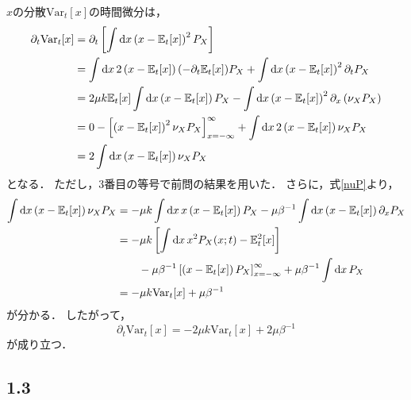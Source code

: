 \documentclass[a4paper,11pt]{jsarticle}
\begin{document}
$x$の分散$\mathrm{Var}_t[x]$の時間微分は，
\begin{align}
  \partial_t \mathrm{Var}_t[x] 
  &= \partial_t \left[ \int \dd{x} \left(x-\mathbb{E}_t[x]\right)^2 P_X \right] \notag\\
  &= \int \dd{x} 2\left(x-\mathbb{E}_t[x]\right)(-\partial_t \mathbb{E}_t[x]) P_X + \int \dd{x} \left(x-\mathbb{E}_t[x]\right)^2 \partial_t P_X \notag\\
  &= 2\mu k \mathbb{E}_t[x] \int \dd{x} \left(x-\mathbb{E}_t[x]\right) P_X - \int \dd{x} \left(x-\mathbb{E}_t[x]\right)^2 \partial_x \left(\nu_X P_X\right) \notag \\
  &= 0 - \left[\left(x-\mathbb{E}_t[x]\right)^2\nu_X P_X\right]_{x=-\infty}^{\infty} + \int \dd{x} 2\left(x-\mathbb{E}_t[x]\right) \nu_X P_X \notag\\
  &= 2\int \dd{x} \left(x-\mathbb{E}_t[x]\right) \nu_X P_X
\end{align}
となる．
ただし，3番目の等号で前問の結果を用いた．
さらに，式\eqref{nuP}より，
\begin{align}
  \int \dd{x} \left(x-\mathbb{E}_t[x]\right) \nu_X P_X 
  &= -\mu k \int \dd{x} x\left(x-\mathbb{E}_t[x]\right) P_X - \mu\beta^{-1} \int \dd{x} \left(x-\mathbb{E}_t[x]\right) \partial_x P_X \notag\\
  &= -\mu k \left[ \int \dd{x} x^2 P_X(x;t) - \mathbb{E}^2_t[x] \right] \notag\\
  &\qquad - \mu\beta^{-1} \left[ \left(x-\mathbb{E}_t[x]\right) P_X \right]_{x=-\infty}^{\infty} + \mu\beta^{-1} \int \dd{x} P_X \notag\\
  &= - \mu k \mathrm{Var}_t[x] + \mu \beta^{-1} \label{i_x-EnuP}
\end{align}
が分かる．
したがって，
\begin{equation}
  \partial_t \mathrm{Var}_t[x] = - 2\mu k \mathrm{Var}_t[x] + 2\mu \beta^{-1}
\end{equation}
が成り立つ．

\subsection*{1.3}
\end{document}
